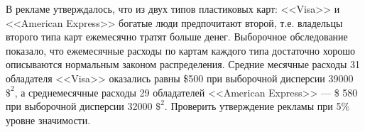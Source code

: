 \documentclass[addpoints, answers]{exam} %
\begin{document}
\begin{questions}
\question  В рекламе утверждалось, что из двух типов пластиковых карт: <<Visa>> и <<American Express>> богатые люди предпочитают второй, т.е. владельцы второго типа карт ежемесячно тратят больше денег. Выборочное обследование показало, что ежемесячные расходы по картам каждого типа достаточно хорошо описываются нормальным законом распределения. Средние месячные расходы 31 обладателя <<Visa>> оказались равны \$500 при выборочной дисперсии 39000 $\$^2$, а среднемесячные расходы 29 обладателей <<American Express>> --- \$ 580 при выборочной дисперсии 32000 $\$^2$. Проверить утверждение рекламы при 5\% уровне значимости.
\end{questions}
\end{document}
